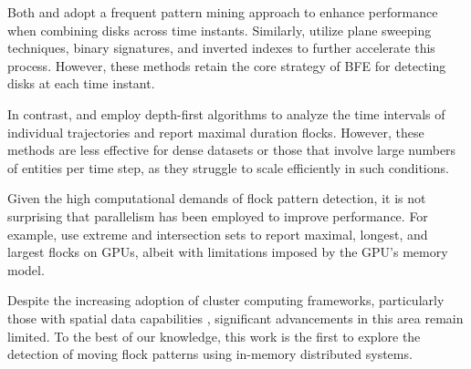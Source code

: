 Both \cite{calderon_romero_mining_2011} and \cite{turdukulov_visual_2014} adopt a frequent pattern mining approach to enhance performance when combining disks across time instants. Similarly, \cite{tanaka_improved_2016} utilize plane sweeping techniques, binary signatures, and inverted indexes to further accelerate this process. However, these methods retain the core strategy of BFE for detecting disks at each time instant.

In contrast, \cite{arimura_finding_2014} and \cite{geng_enumeration_2014} employ depth-first algorithms to analyze the time intervals of individual trajectories and report maximal duration flocks. However, these methods are less effective for dense datasets or those that involve large numbers of entities per time step, as they struggle to scale efficiently in such conditions.

Given the high computational demands of flock pattern detection, it is not surprising that parallelism has been employed to improve performance. For example, \cite{fort_parallel_2014} use extreme and intersection sets to report maximal, longest, and largest flocks on GPUs, albeit with limitations imposed by the GPU's memory model.

Despite the increasing adoption of cluster computing frameworks, particularly those with spatial data capabilities \cite{eldawy_spatialhadoop:_2014, yu_demonstration_2016, pellechia_geomesa:_2015-1, xie_simba:_2016-1}, significant advancements in this area remain limited. To the best of our knowledge, this work is the first to explore the detection of moving flock patterns using in-memory distributed systems.